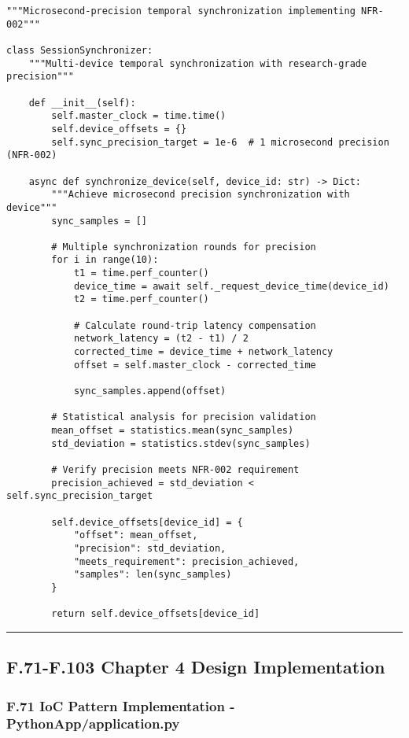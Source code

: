 \documentclass[12pt,a4paper]{article}
\begin{document}
{{\begin{verbatim}
"""Microsecond-precision temporal synchronization implementing NFR-002"""

class SessionSynchronizer:
    """Multi-device temporal synchronization with research-grade precision"""
    
    def __init__(self):
        self.master_clock = time.time()
        self.device_offsets = {}
        self.sync_precision_target = 1e-6  # 1 microsecond precision (NFR-002)
        
    async def synchronize_device(self, device_id: str) -> Dict:
        """Achieve microsecond precision synchronization with device"""
        sync_samples = []
        
        # Multiple synchronization rounds for precision
        for i in range(10):
            t1 = time.perf_counter()
            device_time = await self._request_device_time(device_id)
            t2 = time.perf_counter()
            
            # Calculate round-trip latency compensation
            network_latency = (t2 - t1) / 2
            corrected_time = device_time + network_latency
            offset = self.master_clock - corrected_time
            
            sync_samples.append(offset)
        
        # Statistical analysis for precision validation
        mean_offset = statistics.mean(sync_samples)
        std_deviation = statistics.stdev(sync_samples)
        
        # Verify precision meets NFR-002 requirement
        precision_achieved = std_deviation < self.sync_precision_target
        
        self.device_offsets[device_id] = {
            "offset": mean_offset,
            "precision": std_deviation,
            "meets_requirement": precision_achieved,
            "samples": len(sync_samples)
        }
        
        return self.device_offsets[device_id]
\end{verbatim}

\hrule

\subsection{F.71-F.103 Chapter 4 Design Implementation}

\subsubsection{F.71 IoC Pattern Implementation - PythonApp/application.py}

}}
\end{document}
